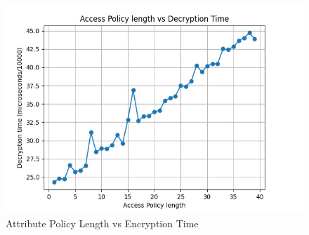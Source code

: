 \begin{figure}
    \centering
    \includegraphics[width=0.75\linewidth]{Images/AccessPolicyVsDecryptionTime.jpeg}
    \caption{Attribute Policy Length vs Encryption Time }
    \label{fig:enter-label}
\end{figure}
